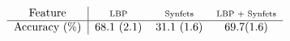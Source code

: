 \documentclass[10pt,twocolumn,letterpaper]{article}
\begin{document}
\begin{table}[tb] \footnotesize 
$\begin{array}{ccccc}
\begin{tabular}{c|}
\multicolumn{1}{c|}{Feature} \\ \hline 
Accuracy (\%) \\ 
\end{tabular}

\begin{tabular}{c}
\multicolumn{1}{c}{\scriptsize{LBP}} \\ \hline 
68.1 (2.1)  \\ 
\end{tabular}

\begin{tabular}{c}
\multicolumn{1}{c}{\scriptsize{Synfets}} \\ \hline
31.1 (1.6)   \\ 
\end{tabular}

\begin{tabular}{c}
\multicolumn{1}{c}{\scriptsize{LBP + Synfets}} \\ \hline 
69.7(1.6)   \\ 
\end{tabular}
\end{array} $
\vspace{1mm}
\centering 
\caption{Classification accuracy on Texture-25 dataset.} \label{table:recognition}
\end{table}






\end{document}
